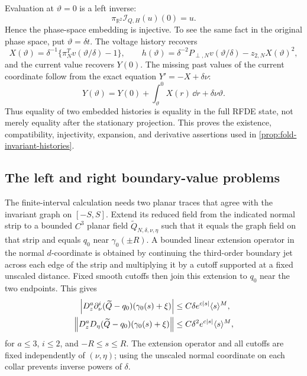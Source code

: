 Evaluation at \(\vartheta=0\) is a left inverse:
\begin{equation}
 \pi_{\mathbb R^2}\mathcal I_{Q,H}(u)(0)=u.
 \label{eq:supp-present-left-inverse}
\end{equation}
Hence the phase-space embedding is injective.  To see the same fact in the original
phase space, put \(\vartheta=\delta t\).  The voltage history recovers
\begin{equation}
 X(\vartheta)=\delta^{-1}\{\pi_N^Tv(\vartheta/\delta)-1\},\qquad
 h(\vartheta)=\delta^{-2}P_{\perp,N}v(\vartheta/\delta)
                  -z_{2,N}X(\vartheta)^2,
 \label{eq:supp-recover-X-h}
\end{equation}
and the current value recovers \(Y(0)\).  The missing past values of the
current coordinate follow from the exact equation \(Y'=-X+\delta\nu\):
\begin{equation}
 Y(\vartheta)=Y(0)+\int_\vartheta^0X(r)\,\dd r
                         +\delta\nu\vartheta.
 \label{eq:supp-recover-Y-history}
\end{equation}
Thus equality of two embedded histories is equality in the full RFDE state,
not merely equality after the stationary projection.  This proves the
existence, compatibility, injectivity, expansion, and derivative assertions
used in \cref{prop:fold-invariant-histories}.

\subsection{The left and right boundary-value problems}

The finite-interval calculation needs two planar traces that agree with the
invariant graph on \([-S,S]\).  Extend its reduced field from the indicated
normal strip to a bounded \(C^3\) planar field
\(\widetilde Q_{N,\delta,\nu,\eta}\) such that it equals the graph field on
that strip and equals \(q_0\) near \(\gamma_0(\pm R)\).  A bounded linear
extension operator in the normal \(d\)-coordinate is obtained by continuing
the third-order boundary jet across each edge of the strip and multiplying
it by a cutoff supported at a fixed unscaled distance.  Fixed smooth cutoffs
then join this extension to \(q_0\) near the two endpoints.  This gives
\begin{align}
 \left\lvert D_z^a\partial_\nu^i
       (\widetilde Q-q_0)(\gamma_0(s)+\xi)\right\rvert
 &\le C\delta e^{c\left\lvert s\right\rvert}\langle s\rangle^M,
 \label{eq:supp-planar-extension-bound}\\
 \left\lVert D_z^aD_\eta
       (\widetilde Q-q_0)(\gamma_0(s)+\xi)\right\rVert
 &\le C\delta^2e^{c\left\lvert s\right\rvert}\langle s\rangle^M,
 \label{eq:supp-planar-extension-structural}
\end{align}
for \(a\le3\), \(i\le2\), and \(-R\le s\le R\).  The extension operator and all
cutoffs are fixed independently of \((\nu,\eta)\); using the unscaled
normal coordinate on each collar prevents inverse powers of \(\delta\).

